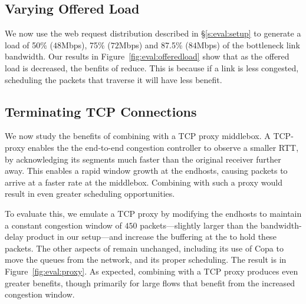 

\subsection{Varying Offered Load}\label{s:eval:offeredload}
We now use the web request distribution described in \S\ref{s:eval:setup} to generate a load of 50\% ($48$Mbps), 75\% ($72$Mbps) and 87.5\% ($84$Mbps) of the bottleneck link bandwidth. Our results in Figure~\ref{fig:eval:offeredload} show that as the offered load is decreased, the benfits of \name reduce. This is because if a link is less congested, scheduling the packets that traverse it will have less benefit.



\subsection{Terminating TCP Connections}\label{s:eval:proxy}

We now study the benefits of combining \name with a TCP proxy middlebox. A TCP-proxy enables the the end-to-end congestion controller to observe a smaller RTT, by acknowledging its segments much faster than the original receiver further away. This enables a rapid window growth at the endhosts, causing packets to arrive at a faster rate at the middlebox. Combining \name with such a proxy would result in even greater scheduling opportunities. 

To evaluate this, we emulate a TCP proxy by modifying the endhosts to maintain a constant congestion window of $450$ packets---slightly larger than the bandwidth-delay product in our setup---and increase the buffering at the \inbox to hold these packets. The other aspects of \name remain unchanged, including its use of Copa to move the queues from the network, and its proper scheduling.
The result is in Figure~\ref{fig:eval:proxy}. As expected, combining \name with a TCP proxy produces even greater benefits, though primarily for large flows that benefit from the increased congestion window. 




